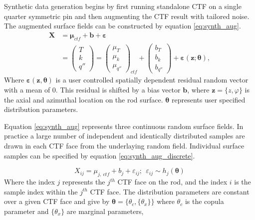 Synthetic data generation begins by first running standalone CTF on a single quarter symmetric pin and then augmenting the CTF result with tailored noise.  The augmented surface fields can be constructed by equation \ref{eq:synth_aug}.
\begin{align}
    \bm X &= \bm \mu_{ctf} + \bm b + \bm \varepsilon \nonumber \\
          &=
    \begin{pmatrix}
        T \\
        k \\
        q''
    \end{pmatrix}
    =
    \begin{pmatrix}
        \mu_{T} \\
        \mu_k \\
        \mu_{q''}
    \end{pmatrix}_{ctf}
    + \begin{pmatrix}
        b_{T} \\
        b_k \\
        b_{q''}
    \end{pmatrix}
    + \bm{\varepsilon} (\mathbf z; \bm \theta),
\label{eq:synth_aug}
\end{align}
Where $\bm \varepsilon(\mathbf z, \bm \theta)$ is a user controlled spatially dependent residual random vector with a mean of 0.  This residual is
shifted by a bias vector
$\mathbf b$, where $\mathbf z=\{z, \varphi\}$ is the axial and azimuthal location on the rod surface.
$\bm \theta$ represents user specified distribution parameters.

Equation \ref{eq:synth_aug} represents three continuous random surface fields.  In practice a large number of independent and identically distributed samples are drawn in each CTF face from the underlaying random field.  Individual surface samples can be specified by equation \ref{eq:synth_aug_discrete}.

\begin{equation}
    X_{ij} = \mu_{j,\ ctf} + b_j + \varepsilon_{ij};\ \   \varepsilon_{ij} \sim h_j(\bm \theta)
    \label{eq:synth_aug_discrete}
\end{equation}
Where the index $j$ represents the $j^{th}$ CTF face on the rod, and the index $i$ is the sample index within the $j^{th}$ CTF face.  The distribution parameters are constant over a given CTF face and give by $\bm \theta = \{\theta_c, \{\theta_x\}\}$ where $\theta_c$ is the copula parameter and  $\{\theta_x\}$ are marginal parameters, 


